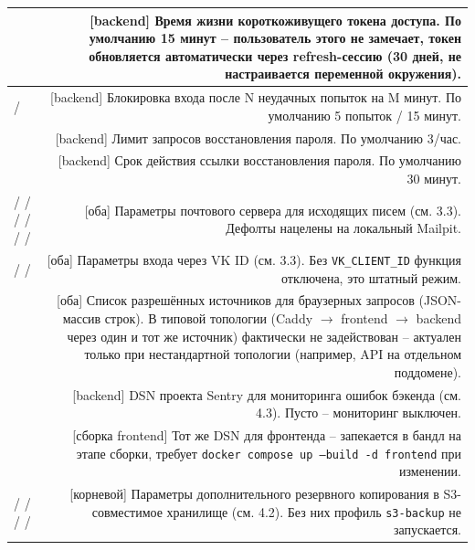 \begin{xltabular}{\textwidth}{|>{\raggedright\arraybackslash\footnotesize}p{4cm}|D|}
\hline
{} & [backend] Время жизни
  короткоживущего токена доступа. По умолчанию 15 минут -- пользователь
  этого не замечает, токен обновляется автоматически через
  refresh-сессию (30 дней, не настраивается переменной окружения). \\
\hline
{} / 
  & [backend] Блокировка входа после N неудачных попыток на M минут. По
  умолчанию 5 попыток / 15 минут. \\
\hline
{} &
  [backend] Лимит запросов восстановления пароля. По умолчанию 3/час. \\
\hline
{} &
  [backend] Срок действия ссылки восстановления пароля. По умолчанию
  30 минут. \\
\hline
{} /  /  /
   /  /
   /  &
  [оба] Параметры почтового сервера для исходящих писем (см. 3.3).
  Дефолты нацелены на локальный Mailpit. \\
\hline
{} /  /
   & [оба] Параметры входа через VK ID (см.
  3.3). Без \texttt{VK\_CLIENT\_ID} функция отключена, это штатный
  режим. \\
\hline
{} & [оба] Список разрешённых источников для
  браузерных запросов (JSON-массив строк). В типовой топологии
  (Caddy $\to$ frontend $\to$ backend через один и тот же источник)
  фактически не задействован -- актуален только при нестандартной
  топологии (например, API на отдельном поддомене). \\
\hline
{} & [backend] DSN проекта Sentry для мониторинга
  ошибок бэкенда (см. 4.3). Пусто -- мониторинг выключен. \\
\hline
{} & [сборка frontend] Тот же DSN для
  фронтенда -- запекается в бандл на этапе сборки, требует
  \texttt{docker compose up --build -d frontend} при изменении. \\
\hline
{} /  /
   /  /
   &
  [корневой] Параметры дополнительного резервного копирования в
  S3-совместимое хранилище (см. 4.2). Без них профиль
  \texttt{s3-backup} не запускается. \\\hline
\end{xltabular}

